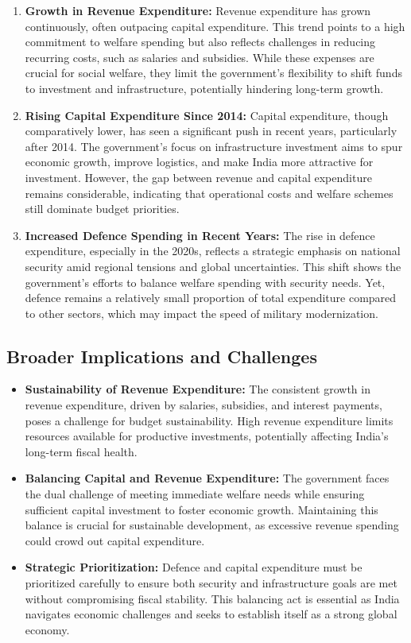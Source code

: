 \documentclass[a4paper,12pt]{extarticle} %
\begin{document}
\begin{enumerate}
    \item \textbf{Growth in Revenue Expenditure:} Revenue expenditure has grown continuously, often outpacing capital expenditure. This trend points to a high commitment to welfare spending but also reflects challenges in reducing recurring costs, such as salaries and subsidies. While these expenses are crucial for social welfare, they limit the government’s flexibility to shift funds to investment and infrastructure, potentially hindering long-term growth.
    \item \textbf{Rising Capital Expenditure Since 2014:} Capital expenditure, though comparatively lower, has seen a significant push in recent years, particularly after 2014. The government’s focus on infrastructure investment aims to spur economic growth, improve logistics, and make India more attractive for investment. However, the gap between revenue and capital expenditure remains considerable, indicating that operational costs and welfare schemes still dominate budget priorities.
    \item \textbf{Increased Defence Spending in Recent Years:} The rise in defence expenditure, especially in the 2020s, reflects a strategic emphasis on national security amid regional tensions and global uncertainties. This shift shows the government’s efforts to balance welfare spending with security needs. Yet, defence remains a relatively small proportion of total expenditure compared to other sectors, which may impact the speed of military modernization.
\end{enumerate}

\subsection{Broader Implications and Challenges}

\begin{itemize}
    \item \textbf{Sustainability of Revenue Expenditure:} The consistent growth in revenue expenditure, driven by salaries, subsidies, and interest payments, poses a challenge for budget sustainability. High revenue expenditure limits resources available for productive investments, potentially affecting India’s long-term fiscal health.
    \item \textbf{Balancing Capital and Revenue Expenditure:} The government faces the dual challenge of meeting immediate welfare needs while ensuring sufficient capital investment to foster economic growth. Maintaining this balance is crucial for sustainable development, as excessive revenue spending could crowd out capital expenditure.
    \item \textbf{Strategic Prioritization:} Defence and capital expenditure must be prioritized carefully to ensure both security and infrastructure goals are met without compromising fiscal stability. This balancing act is essential as India navigates economic challenges and seeks to establish itself as a strong global economy.\cite{expgov}
\end{itemize}
\end{document}
